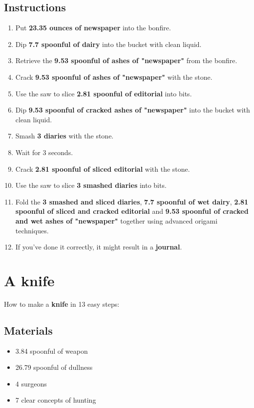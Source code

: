 \documentclass{article}
\begin{document}
\subsection{Instructions}\begin{enumerate}
\item 
Put \textbf{23.35 ounces of newspaper} into the bonfire.
\item 
Dip \textbf{7.7 spoonful of dairy} into the bucket with clean liquid.
\item 
Retrieve the \textbf{9.53 spoonful of ashes of "newspaper"} from the bonfire.
\item 
Crack \textbf{9.53 spoonful of ashes of "newspaper"} with the stone.
\item 
Use the saw to slice \textbf{2.81 spoonful of editorial} into bits.
\item 
Dip \textbf{9.53 spoonful of cracked ashes of "newspaper"} into the bucket with clean liquid.
\item 
Smash \textbf{3 diaries} with the stone.
\item 
Wait for 3 seconds.
\item 
Crack \textbf{2.81 spoonful of sliced editorial} with the stone.
\item 
Use the saw to slice \textbf{3 smashed diaries} into bits.
\item 
Fold the \textbf{3 smashed and sliced diaries}, \textbf{7.7 spoonful of wet dairy}, \textbf{2.81 spoonful of sliced and cracked editorial} and \textbf{9.53 spoonful of cracked and wet ashes of "newspaper"} together using advanced origami techniques.
\item 
If you've done it correctly, it might result in a \textbf{journal}.
\end{enumerate}
\newpage
\section{A knife}How to make a \textbf{knife} in 13 easy steps:

\subsection{Materials}\begin{itemize}
\item 
3.84 spoonful of weapon
\item 
26.79 spoonful of dullness
\item 
4 surgeons
\item 
7 clear concepts of hunting
\end{itemize}
\end{document}
